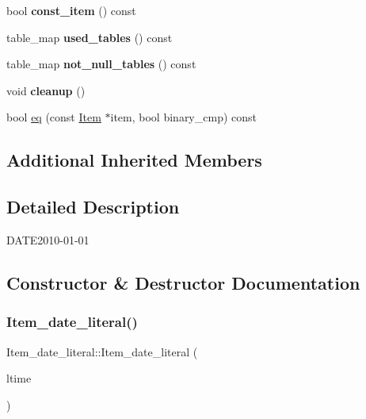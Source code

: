 \begin{DoxyCompactItemize}
bool {\bfseries const\+\_\+item} () const
\item 
\mbox{\label{classItem__date__literal_a5dfcaaca642b312f639d65b6245063f1}} 
table\+\_\+map {\bfseries used\+\_\+tables} () const
\item 
\mbox{\label{classItem__date__literal_aea99b02f3249fc0f234d0aaf20767620}} 
table\+\_\+map {\bfseries not\+\_\+null\+\_\+tables} () const
\item 
\mbox{\label{classItem__date__literal_a0d95bdf77d715dffda24e634296027a2}} 
void {\bfseries cleanup} ()
\item 
bool \mbox{\hyperlink{classItem__date__literal_a34fad994fb206e5c7bacf2f7b8455dd7}{eq}} (const \mbox{\hyperlink{classItem}{Item}} $\ast$item, bool binary\+\_\+cmp) const
\end{DoxyCompactItemize}
\subsection*{Additional Inherited Members}


\subsection{Detailed Description}
D\+A\+TE\textquotesingle{}2010-\/01-\/01\textquotesingle{} 

\subsection{Constructor \& Destructor Documentation}
\mbox{\label{classItem__date__literal_a20fb73b64181defeecac08762bbf5959}} 
\subsubsection{\texorpdfstring{Item\+\_\+date\+\_\+literal()}{Item\_date\_literal()}}
{\footnotesize\ttfamily Item\+\_\+date\+\_\+literal\+::\+Item\+\_\+date\+\_\+literal (\begin{DoxyParamCaption}\item[{M\+Y\+S\+Q\+L\+\_\+\+T\+I\+ME $\ast$}]{ltime }\end{DoxyParamCaption})\hspace{0.3cm}{\ttfamily [inline]}}

